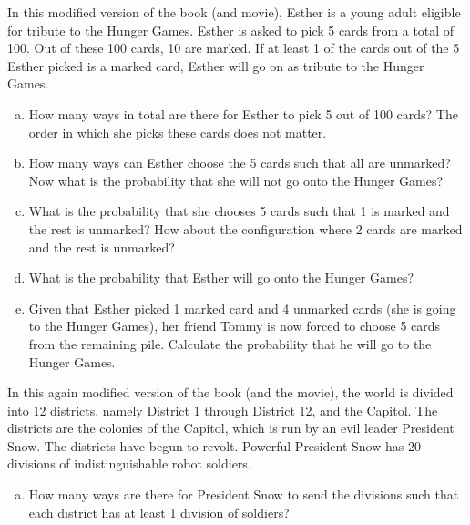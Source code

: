 \documentclass[]{article}
\newif\ifmotivation
\begin{document}
\begin{qunlist}

In this modified version of the book (and movie), Esther is a young adult eligible for tribute to the Hunger Games. Esther is asked to pick 5 cards from a total of 100. Out of these 100 cards, 10 are marked. If at least 1 of the cards out of the 5 Esther picked is a marked card, Esther will go on as tribute to the Hunger Games. 

\begin{enumerate}[a)]
  \qpart
\item How many ways in total are there for Esther to pick 5 out of 100 cards? The order in which she picks these cards does not matter. 
  
  \qpart
\item How many ways can Esther choose the 5 cards such that all are unmarked? Now what is the probability that she will not go onto the Hunger Games? 
  
  \qpart
\item What is the probability that she chooses 5 cards such that 1 is marked and the rest is unmarked? How about the configuration where 2 cards are marked and the rest is unmarked? 
  
  \qpart
\item What is the probability that Esther will go onto the Hunger Games? 
  
  \qpart
\item Given that Esther picked 1 marked card and 4 unmarked cards (she is going to the Hunger Games), her friend Tommy is now forced to choose 5 cards from the remaining pile. Calculate the probability that he will go to the Hunger Games. 
\end{enumerate}

\ifmotivation
{\motivation {Motivation - Basic counting and probability.}}
\fi 


In this again modified version of the book (and the movie), the world is divided into 12 districts, namely District 1 through District 12, and the Capitol. The districts are the colonies of the Capitol, which is run by an evil leader President Snow. The districts have begun to revolt. Powerful President Snow has 20 divisions of indistinguishable robot soldiers. 

\begin{enumerate}[a)]
  \qpart
\item How many ways are there for President Snow to send the divisions such that each district has at least 1 division of soldiers?
  

\end{enumerate}
\end{qunlist}
\end{document}
